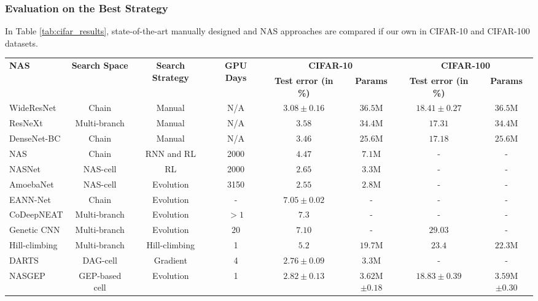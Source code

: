 \documentclass[conference]{IEEEtran}
\begin{document}
	\subsubsection{Evaluation on the Best Strategy}
	
	In Table \ref{tab:cifar_results}, state-of-the-art manually designed and NAS approaches are compared if our own in CIFAR-10 and CIFAR-100 datasets.
	
	\begin{table*}[htb]
		\centering
		\caption{Results from CIFAR datasets.}
		\label{tab:cifar_results}{\begin{tabular}{@{}lccccccc@{}}
				\toprule
				\multirow{2}{*}{\textbf{NAS}} & \multirow{2}{*}{\textbf{Search Space}} & \multirow{2}{*}{\textbf{Search Strategy}} & \multirow{2}{*}{\textbf{GPU Days}} & \multicolumn{2}{c}{\textbf{CIFAR-10}} & \multicolumn{2}{c}{\textbf{CIFAR-100}} \\
				&  &  &  & \textbf{Test error (in \%)} & \textbf{Params} & \textbf{Test error (in \%)} & \textbf{Params} \\ \midrule
				WideResNet \cite{zagoruyko2016wide} & Chain & Manual & N/A & $3.08\pm0.16$ & $36.5$M & $18.41\pm0.27$ & $36.5$M \\
				ResNeXt \cite{xie2017aggregated} & Multi-branch & Manual & N/A & $3.58$ & $34.4$M & $17.31$ & $34.4$M \\
				DenseNet-BC \cite{huang2017densely} & Chain & Manual & N/A & $3.46$ & $25.6$M & $17.18$ & $25.6$M \\ \midrule                
				NAS \cite{zoph2016neural} & Chain & RNN and RL & 2000 & $4.47$ & $7.1$M & - & - \\
				NASNet \cite{zoph2017learning} & NAS-cell & RL & 2000 & $2.65$ & $3.3$M & - & - \\
				AmoebaNet \cite{real2018regularized} & NAS-cell & Evolution & 3150 & $2.55$ & $2.8$M & - & - \\
				EANN-Net \cite{chen2019auto} & Chain & Evolution &  - & $7.05\pm0.02$ & - & - & - \\
				CoDeepNEAT \cite{miikkulainen2017evolving} & Multi-branch & Evolution & $>1$ & $7.3$ & - & - & - \\
				Genetic CNN \cite{xie2017genetic} & Multi-branch & Evolution & 20 & $7.10$ & - & $29.03$ & - \\
				Hill-climbing \cite{elsken2017simple} & Multi-branch & Hill-climbing & 1 & $5.2$ & $19.7$M & $23.4$ & $22.3$M \\                               
				DARTS \cite{liu2018darts} & DAG-cell & Gradient & 4 & $2.76\pm0.09$ & $3.3$M & - & - \\ \midrule
				NASGEP & GEP-based cell & Evolution & 1 & $2.82\pm0.13$ & $3.62$M$\pm0.18$ & $18.83\pm0.39$ & $3.59$M$\pm0.30$ \\ \bottomrule
			\end{tabular}}
	\end{table*}
	
\end{document}
